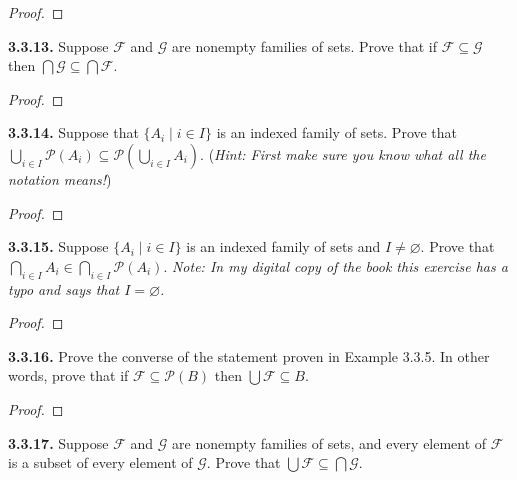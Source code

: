\documentclass[12pt]{amsart}
\newenvironment{statement}[1]{\smallskip\noindent\color[rgb]{.6627, .3529, .6314} {\bf #1.}}{}
\theoremstyle{definition}
\theoremstyle{remark}
\begin{document}
\begin{proof}
\end{proof}


\begin{statement}{3.3.13}
Suppose $\mathcal{F}$ and $\mathcal{G}$ are nonempty families of sets.
Prove that if $\mathcal{F} \subseteq \mathcal{G}$ then $\bigcap \mathcal{G} \subseteq \bigcap \mathcal{F}$.
\end{statement}

\begin{proof}
\end{proof}


\begin{statement}{3.3.14}
Suppose that $\{ A_i \mid i \in I \}$ is an indexed family of sets.
Prove that $\bigcup_{i \in I} \mathscr{P}(A_i) \subseteq \mathscr{P} \left( \bigcup_{i \in I} A_i \right)$.
(\emph{Hint: First make sure you know what all the notation means!})
\end{statement}

\begin{proof}
\end{proof}


\begin{statement}{3.3.15}
Suppose $\{ A_i \mid i \in I \}$ is an indexed family of sets and $I \neq \varnothing$.
Prove that $\bigcap_{i \in I} A_i \in \bigcap_{i \in I} \mathscr{P}(A_i)$.
\emph{Note: In my digital copy of the book this exercise has a typo and says that $I = \varnothing$.}
\end{statement}

\begin{proof}
\end{proof}


\begin{statement}{3.3.16}
Prove the converse of the statement proven in Example 3.3.5.
In other words, prove that if $\mathcal{F} \subseteq \mathscr{P}(B)$ then $\bigcup \mathcal{F} \subseteq B$.
\end{statement}

\begin{proof}
\end{proof}


\begin{statement}{3.3.17}
Suppose $\mathcal{F}$ and $\mathcal{G}$ are nonempty families of sets, and every element of $\mathcal{F}$ is a subset of every element of $\mathcal{G}$.
Prove that $\bigcup \mathcal{F} \subseteq \bigcap \mathcal{G}$.
\end{statement}
\end{document}
